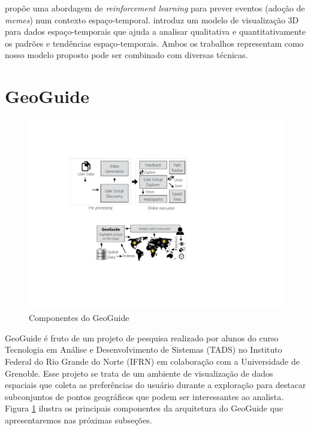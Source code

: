  propõe uma abordagem de {\em reinforcement learning} para prever eventos (adoção de {\em memes}) num contexto espaço-temporal.  introduz um modelo de visualização 3D para dados espaço-temporais que ajuda a analisar qualitativa e quantitativamente os padrões e tendências espaço-temporais. Ambos os trabalhos representam como nosso modelo proposto pode ser combinado com diversas técnicas.

\section{GeoGuide}

\begin{figure}[t]
	\centering
	\includegraphics[width=\columnwidth]{imagens/framework}
	\caption{Componentes do GeoGuide}
	\label{fig:framework}
	\vspace{-10pt}
\end{figure}


GeoGuide \cite{omidvarTehrani2017} é fruto de um projeto de pesquisa realizado por alunos do curso Tecnologia em Análise e Desenvolvimento de Sistemas (TADS) no Instituto Federal do Rio Grande do Norte (IFRN) em colaboração com a Universidade de Grenoble. Esse projeto se trata de um ambiente de visualização de dados espaciais que coleta as preferências do usuário durante a exploração para destacar subconjuntos de pontos geográficos que podem ser interessantes ao analista. Figura \ref{fig:framework} ilustra os principais componentes da arquitetura do GeoGuide que apresentaremos nas próximas subseções.

